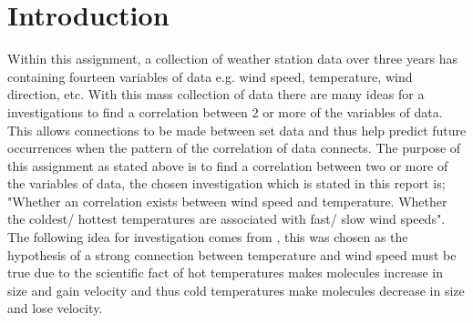 \documentclass[12pt]{article}
\begin{document}

\newpage
\begin{titlepage}
\begin{tableofcontents}

\end{tableofcontents}
\end{titlepage}


\section{Introduction}

Within this assignment, a collection of weather station data over three years has containing fourteen variables of data e.g. wind speed, temperature, wind direction, etc. With this mass collection of data there are many ideas for a investigations to find a correlation between 2 or more of the variables of data. This allows connections to be made between set data and thus help predict future occurrences when the pattern of the correlation of data connects. The purpose of this assignment as stated above is to find a correlation between two or more of the variables of data, the chosen investigation which is stated in this report is; \\

"Whether an correlation exists between wind speed and temperature. Whether the coldest/ hottest temperatures are associated with fast/ slow wind speeds". The following idea for investigation comes from \cite{Weather_Station}, this was chosen as the hypothesis of a strong connection between temperature and wind speed must be true due to the scientific fact of hot temperatures makes molecules increase in size and gain velocity and thus cold temperatures make molecules decrease in size and lose velocity.

\end{document}
